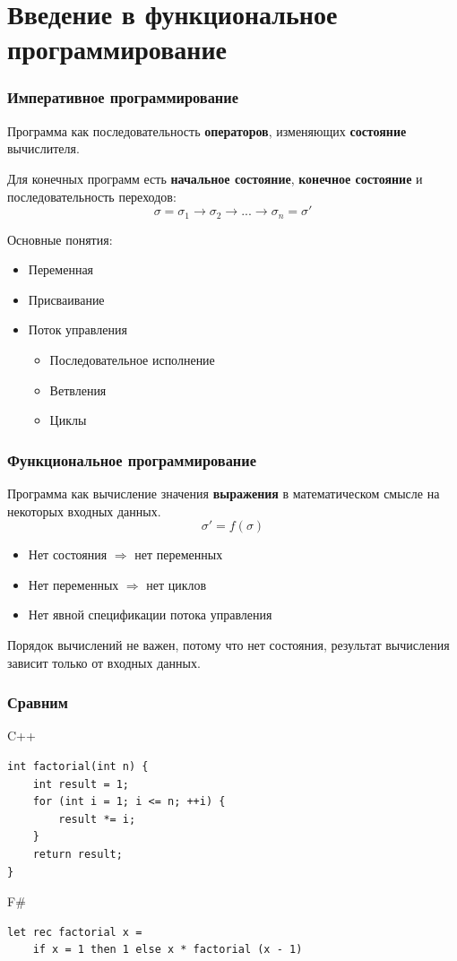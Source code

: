 \documentclass[xetex,mathserif,serif]{beamer}
\begin{document}
	\section{Введение в функциональное программирование}
	
	\begin{frame}
		\frametitle{Императивное программирование}
		Программа как последовательность \textbf{операторов}, изменяющих \textbf{состояние} вычислителя.

		Для конечных программ есть \textbf{начальное состояние}, \textbf{конечное состояние} и последовательность переходов:
		$$\sigma = \sigma_1 \rightarrow \sigma_2 \rightarrow ... \rightarrow \sigma_n = \sigma'$$
		
		Основные понятия:
		\begin{itemize}
			\item Переменная
			\item Присваивание
			\item Поток управления
			\begin{itemize}
				\item Последовательное исполнение
				\item Ветвления
				\item Циклы
			\end{itemize}
		\end{itemize}
	\end{frame}
	
	\begin{frame}
		\frametitle{Функциональное программирование}
		Программа как вычисление значения \textbf{выражения} в математическом смысле на некоторых входных данных.
		$$\sigma' = f(\sigma)$$
	
		\begin{itemize}
			\item Нет состояния $\Rightarrow$ нет переменных
			\item Нет переменных $\Rightarrow$ нет циклов
			\item Нет явной спецификации потока управления
		\end{itemize}
		Порядок вычислений не важен, потому что нет состояния, результат вычисления зависит только от входных данных.
	\end{frame}
	
	\begin{frame}[fragile]
		\frametitle{Сравним}
		\begin{alertblock}{C++}
			\begin{verbatim}
int factorial(int n) {
    int result = 1;
    for (int i = 1; i <= n; ++i) {
        result *= i;
    }
    return result;
}
			\end{verbatim}
		\end{alertblock}
		\begin{exampleblock}{F\#}
			\begin{verbatim}
let rec factorial x =
    if x = 1 then 1 else x * factorial (x - 1)
            \end{verbatim}
		\end{exampleblock}
\end{frame}
\end{document}
